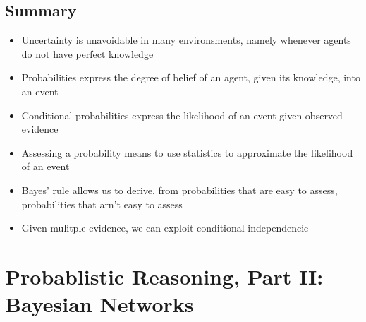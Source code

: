\documentclass{scrartcl}
\begin{document}
\subsection{Summary}
\begin{itemize}
    \item
        Uncertainty is unavoidable in many environsments, namely whenever agents do not have perfect knowledge
    \item
        Probabilities express the degree of belief of an agent, given its knowledge, into an event
    \item
        Conditional probabilities express the likelihood of an event given observed evidence
    \item
        Assessing a probability means to use statistics to approximate the likelihood of an event
    \item
        Bayes' rule allows us to derive, from probabilities that are easy to assess, probabilities that arn't easy to assess
    \item
        Given mulitple evidence, we can exploit conditional independencie
\end{itemize}

\section{Probablistic Reasoning, Part II: Bayesian Networks}
\end{document}
